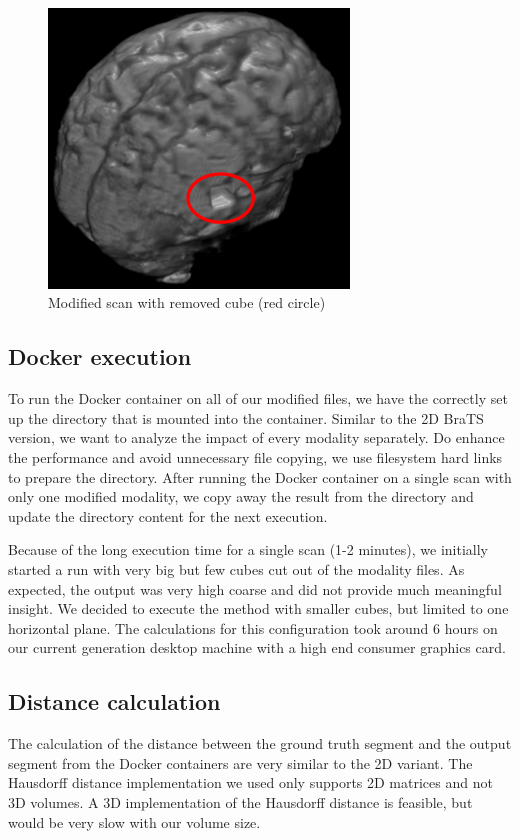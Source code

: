 \begin{figure}[H]
\centering
\includegraphics[width=8cm]{chapters/07_brats3d/images/brain-hdm-marked.png}
\caption{Modified scan with removed cube (red circle)}
\label{brats3d_example}
\end{figure}

\subsection{Docker execution}
To run the Docker container on all of our modified files, we have the correctly set up the directory that is mounted into the container. Similar to the 2D BraTS version, we want to analyze the impact of every modality separately. Do enhance the performance and avoid unnecessary file copying, we use filesystem hard links to prepare the directory. After running the Docker container on a single scan with only one modified modality, we copy away the result from the directory and update the directory content for the next execution.

Because of the long execution time for a single scan (1-2 minutes), we initially started a run with very big but few cubes cut out of the modality files. As expected, the output was very high coarse and did not provide much meaningful insight. We decided to execute the method with smaller cubes, but limited to one horizontal plane. The calculations for this configuration took around 6 hours on our current generation desktop machine with a high end consumer graphics card.

\subsection{Distance calculation}
The calculation of the distance between the ground truth segment and the output segment from the Docker containers are very similar to the 2D variant. The Hausdorff distance implementation we used only supports 2D matrices and not 3D volumes. A 3D implementation of the Hausdorff distance is feasible, but would be very slow with our volume size. 

